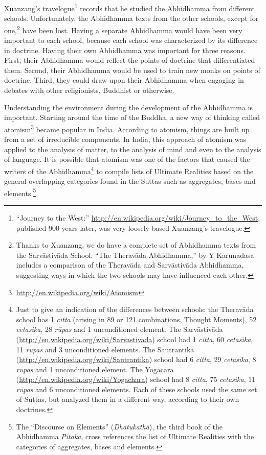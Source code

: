 \pagebreak

Xuanzang’s travelogue\footnote{“Journey to the West:” \url{http://en.wikipedia.org/wiki/Journey_to_the_West}, published 900 years later, was very loosely based Xuanzang’s travelogue.} records that he studied the Abhidhamma from different schools. Unfortunately, the Abhidhamma texts from the other schools, except for one,\footnote{Thanks to Xuanzang, we do have a complete set of Abhidhamma texts from the Sarvāstivāda School. “The Theravāda Abhidhamma,” by Y Karunadasa includes a comparison of the Theravāda and Sarvāstivāda Abhidhamma, suggesting ways in which the two schools may have influenced each other.} have been lost. Having a separate Abhidhamma would have been very important to each school, because each school was characterized by its difference in doctrine. Having their own Abhidhamma was important for three reasons. First, their Abhidhamma would reflect the points of doctrine that differentiated them. Second, their Abhidhamma would be used to train new monks on points of doctrine. Third, they could draw upon their Abhidhamma when engaging in debates with other religionists, Buddhist or otherwise.

Understanding the environment during the development of the Abhidhamma is important. Starting around the time of the Buddha, a new way of thinking called atomism\footnote{\url{http://en.wikipedia.org/wiki/Atomism}} became popular in India. According to atomism, things are built up from a set of irreducible components. In India, this approach of atomism was applied to the analysis of matter, to the analysis of mind and even to the analysis of language. It is possible that atomism was one of the factors that caused the writers of the Abhidhamma\footnote{Just to give an indication of the differences between schools: the Theravāda school has 1 \textit{citta} (arising in 89 or 121 combinations, Thought Moments), 52 \textit{cetasika}, 28 \textit{rūpas} and 1 unconditioned element. The Sarvāstivāda (\url{http://en.wikipedia.org/wiki/Sarvastivada}) school had 1 \textit{citta}, 60 \textit{cetasika}, 11 \textit{rūpas} and 3 unconditioned elements. The Sautrāntika (\url{http://en.wikipedia.org/wiki/Sautrantika}) school had 6 \textit{citta}, 29 \textit{cetasika}, 8 \textit{rūpas} and 1 unconditioned element. The Yogācāra (\url{http://en.wikipedia.org/wiki/Yogachara}) school had 8 \textit{citta}, 75 \textit{cetasika}, 11 \textit{rūpas} and 6 unconditioned elements. Each of these schools used the same set of Suttas, but analyzed them in a different way, according to their own doctrines.} to compile lists of Ultimate Realities based on the general overlapping categories found in the Suttas such as aggregates, bases and elements.\footnote{The “Discourse on Elements” (\textit{Dhātukathā}), the third book of the Abhidhamma \textit{Piṭaka}, cross references the list of Ultimate Realities with the categories of aggregates, bases and elements.}

